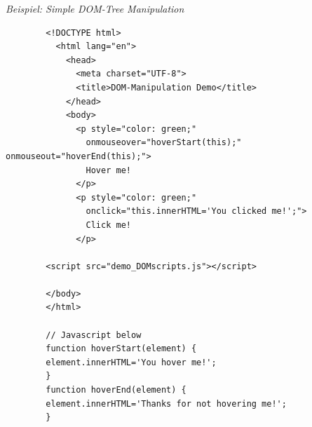 \documentclass[11pt]{article}
\begin{document}
        \emph{Beispiel: Simple DOM-Tree Manipulation}
    \begin{verbatim}
        <!DOCTYPE html>
          <html lang="en">
            <head>
              <meta charset="UTF-8">
              <title>DOM-Manipulation Demo</title>
            </head>
            <body>
              <p style="color: green;"
                onmouseover="hoverStart(this);" onmouseout="hoverEnd(this);">
                Hover me!
              </p>
              <p style="color: green;"
                onclick="this.innerHTML='You clicked me!';">
                Click me!
              </p>

        <script src="demo_DOMscripts.js"></script>

        </body>
        </html>

        // Javascript below
        function hoverStart(element) {
        element.innerHTML='You hover me!';
        }
        function hoverEnd(element) {
        element.innerHTML='Thanks for not hovering me!';
        }
    \end{verbatim}
\end{document}
